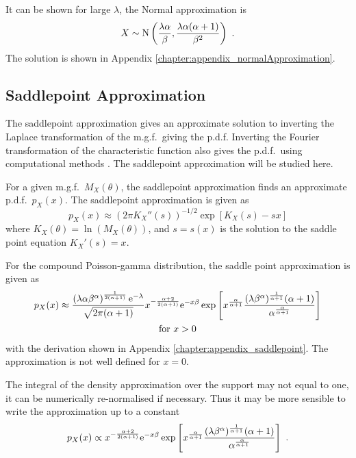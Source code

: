 It can be shown for large $\lambda$, the Normal approximation \citep{shevtsova2014on} is
\begin{equation}
  X\sim\operatorname{N}\left(\frac{\lambda\alpha}{\beta},\frac{\lambda\alpha(\alpha+1)}{\beta^2}\right) \ .
\end{equation}
The solution is shown in Appendix \ref{chapter:appendix_normalApproximation}.

\subsection{Saddlepoint Approximation}

The saddlepoint approximation \citep{daniels1954saddlepoint} gives an approximate solution to inverting the Laplace transformation of the m.g.f.~giving the p.d.f. Inverting the Fourier transformation of the characteristic function also gives the p.d.f.~using computational methods \citep{dunn2008evaluation}. The saddlepoint approximation will be studied here.

For a given m.g.f.~$M_X(\theta)$, the saddlepoint approximation \citep{daniels1954saddlepoint, butler2007saddlepoint} finds an approximate p.d.f.~$p_X(x)$. The saddlepoint approximation is given as
\begin{equation}
  p_X(x)\approx\left(2\pi K_X''(s)\right)^{-1/2}\exp\left[K_X(s)-sx\right]
  \label{eq:saddlePoint:generalSaddlePoint}
\end{equation}
where $K_X(\theta) = \ln\left(M_X(\theta)\right)$, and $s=s(x)$ is the solution to the saddle point equation $K_X'(s)=x$.

For the compound Poisson-gamma distribution, the saddle point approximation \citep{jensen1991saddlepoint} is given as 
\begin{multline}
  p_X(x)\approx
  \frac{\left(\lambda\alpha\beta^\alpha\right)^{\frac{1}{2(\alpha+1)}}\mathrm{e}^{-\lambda}}{\sqrt{2\pi(\alpha+1)}}x^{-\frac{\alpha+2}{2(\alpha+1)}}
  \mathrm{e}^{-x\beta}
  \exp\left[x^{\frac{\alpha}{\alpha+1}}
    \frac{(\lambda\beta^\alpha)^{\frac{1}{\alpha+1}}(\alpha+1)}{\alpha^{\frac{\alpha}{\alpha+1}}}
  \right]
  \\
  \text{for }x>0
  \label{eq:saddle_point_approx}
\end{multline}
with the derivation shown in Appendix \ref{chapter:appendix_saddlepoint}. The approximation is not well defined for $x=0$.

The integral of the density approximation over the support may not equal to one, it can be numerically re-normalised if necessary. Thus it may be more sensible to write the approximation up to a constant
\begin{equation}
  p_X(x)\propto x^{-\frac{\alpha+2}{2(\alpha+1)}}\mathrm{e}^{-x\beta}
  \exp\left[
    x^{\frac{\alpha}{\alpha+1}}
    \frac{
      (\lambda\beta^\alpha)^{\frac{1}{\alpha+1}}(\alpha+1)
    }
    {
      \alpha^{\frac{\alpha}{\alpha+1}}
    }
  \right]
  \ .
\end{equation}

